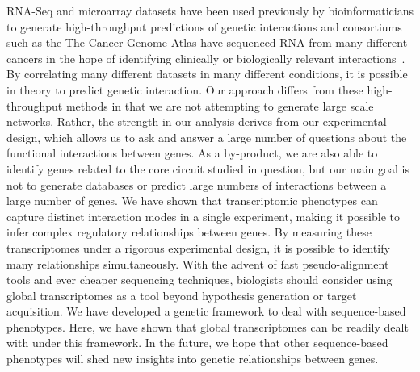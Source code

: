 \documentclass[9pt,twocolumn,twoside]{pnas-new}
\begin{document}
RNA-Seq and microarray datasets have been used previously by bioinformaticians to generate high-throughput predictions of genetic interactions and consortiums such as the The Cancer Genome Atlas have sequenced RNA from many different cancers in the hope of identifying clinically or biologically relevant interactions~\cite{}. By correlating many different datasets in many different conditions, it is possible in theory to predict genetic interaction. Our approach differs from these high-throughput methods in that we are not attempting to generate large scale networks. Rather, the strength in our analysis derives from our experimental design, which allows us to ask and answer a large number of questions about the functional interactions between genes.
As a by-product, we are also able to identify genes related to the core circuit studied in question, but our main goal is not to generate databases or predict large numbers of interactions between a large number of genes. We have shown that transcriptomic phenotypes can capture distinct interaction modes in a single experiment, making it possible to infer complex regulatory relationships between genes. By measuring these transcriptomes under a rigorous experimental design, it is possible to identify many relationships simultaneously. With the advent of fast pseudo-alignment tools and ever cheaper sequencing techniques, biologists should consider using global transcriptomes as a tool beyond hypothesis generation or target acquisition.
We have developed a genetic framework to deal with sequence-based phenotypes. Here, we have shown that global transcriptomes can be readily dealt with under this framework. In the future, we hope that other sequence-based phenotypes will shed new insights into genetic relationships between genes.
\end{document}
